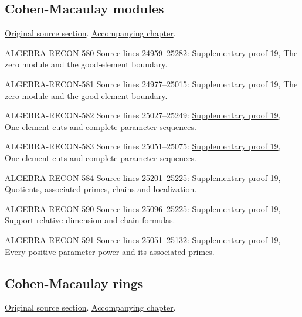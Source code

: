\subsection{Cohen-Macaulay modules}
\hypertarget{algebra-source-section-CM}{}
\noindent\href{https://github.com/stacks/stacks-project/blob/a04446e57ec1fbc252a871afcec7752fb2807b14/algebra.tex\#L24952}{Original source section}. \href{algebra.pdf\#nameddest=section-CM}{Accompanying chapter}.

\begin{AlgebraSourceRoutes}
\item[ALGEBRA-RECON-580] Source lines 24959--25282: \hyperlink{algebra_cm_modules_notes_20260928}{Supplementary proof 19}, The zero module and the good-element boundary.
\item[ALGEBRA-RECON-581] Source lines 24977--25015: \hyperlink{algebra_cm_modules_notes_20260928}{Supplementary proof 19}, The zero module and the good-element boundary.
\item[ALGEBRA-RECON-582] Source lines 25027--25249: \hyperlink{algebra_cm_modules_notes_20260928}{Supplementary proof 19}, One-element cuts and complete parameter sequences.
\item[ALGEBRA-RECON-583] Source lines 25051--25075: \hyperlink{algebra_cm_modules_notes_20260928}{Supplementary proof 19}, One-element cuts and complete parameter sequences.
\item[ALGEBRA-RECON-584] Source lines 25201--25225: \hyperlink{algebra_cm_modules_notes_20260928}{Supplementary proof 19}, Quotients, associated primes, chains and localization.
\item[ALGEBRA-RECON-590] Source lines 25096--25225: \hyperlink{algebra_cm_modules_notes_20260928}{Supplementary proof 19}, Support-relative dimension and chain formulas.
\item[ALGEBRA-RECON-591] Source lines 25051--25132: \hyperlink{algebra_cm_modules_notes_20260928}{Supplementary proof 19}, Every positive parameter power and its associated primes.
\end{AlgebraSourceRoutes}

\subsection{Cohen-Macaulay rings}
\hypertarget{algebra-source-section-CM-ring}{}
\noindent\href{https://github.com/stacks/stacks-project/blob/a04446e57ec1fbc252a871afcec7752fb2807b14/algebra.tex\#L25298}{Original source section}. \href{algebra.pdf\#nameddest=section-CM-ring}{Accompanying chapter}.

